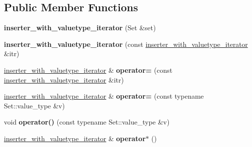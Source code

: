 \subsection*{Public Member Functions}
\begin{DoxyCompactItemize}
\item 
\hypertarget{classstrtk_1_1inserter__with__valuetype__iterator_aecab8b0ca75d5cfc23d42245e2d25357}{{\bfseries inserter\-\_\-with\-\_\-valuetype\-\_\-iterator} (Set \&set)}\label{classstrtk_1_1inserter__with__valuetype__iterator_aecab8b0ca75d5cfc23d42245e2d25357}

\item 
\hypertarget{classstrtk_1_1inserter__with__valuetype__iterator_aa90d59fbbbe0e1bd3e4397a26d986502}{{\bfseries inserter\-\_\-with\-\_\-valuetype\-\_\-iterator} (const \hyperlink{classstrtk_1_1inserter__with__valuetype__iterator}{inserter\-\_\-with\-\_\-valuetype\-\_\-iterator} \&itr)}\label{classstrtk_1_1inserter__with__valuetype__iterator_aa90d59fbbbe0e1bd3e4397a26d986502}

\item 
\hypertarget{classstrtk_1_1inserter__with__valuetype__iterator_a998a63578bf293fb1fc95d82128a5cef}{\hyperlink{classstrtk_1_1inserter__with__valuetype__iterator}{inserter\-\_\-with\-\_\-valuetype\-\_\-iterator} \& {\bfseries operator=} (const \hyperlink{classstrtk_1_1inserter__with__valuetype__iterator}{inserter\-\_\-with\-\_\-valuetype\-\_\-iterator} \&itr)}\label{classstrtk_1_1inserter__with__valuetype__iterator_a998a63578bf293fb1fc95d82128a5cef}

\item 
\hypertarget{classstrtk_1_1inserter__with__valuetype__iterator_a586666811db9b51377a4764c901524f9}{\hyperlink{classstrtk_1_1inserter__with__valuetype__iterator}{inserter\-\_\-with\-\_\-valuetype\-\_\-iterator} \& {\bfseries operator=} (const typename Set\-::value\-\_\-type \&v)}\label{classstrtk_1_1inserter__with__valuetype__iterator_a586666811db9b51377a4764c901524f9}

\item 
\hypertarget{classstrtk_1_1inserter__with__valuetype__iterator_a7ab7ff64e5376644b77ba073bb1de4bc}{void {\bfseries operator()} (const typename Set\-::value\-\_\-type \&v)}\label{classstrtk_1_1inserter__with__valuetype__iterator_a7ab7ff64e5376644b77ba073bb1de4bc}

\item 
\hypertarget{classstrtk_1_1inserter__with__valuetype__iterator_a894b23749335da50a97349ee002bd6e7}{\hyperlink{classstrtk_1_1inserter__with__valuetype__iterator}{inserter\-\_\-with\-\_\-valuetype\-\_\-iterator} \& {\bfseries operator$\ast$} ()}\label{classstrtk_1_1inserter__with__valuetype__iterator_a894b23749335da50a97349ee002bd6e7}


\end{DoxyCompactItemize}
